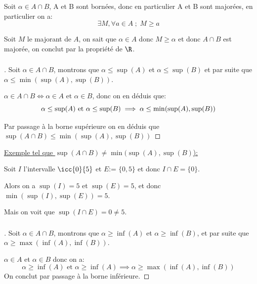 \subsubsection*{}

Soit \(\alpha \in A \cap B\), A et B sont bornées, donc en particulier A et B sont majorées, en particulier on a:
\[
   \exists M, \forall a \in A \; ; \; M \geq a
\]   

Soit \(M\) le majorant de \(A\), on sait que \(\alpha \in A\) donc \(M \geq \alpha\) et donc \(A \cap B\) est majorée, on conclut par la propriété de \(\R\).

\subsubsection*{}
\begin{proof}[\unskip\nopunct]
   Soit \(\alpha \in A \cap B\), montrons que \(\alpha \leq \sup(A)\) et \(\alpha \leq \sup(B)\) et par suite que \(\alpha \leq \min(\sup(A), \sup(B))\). \<

   \(\alpha \in A \cap B \Longleftrightarrow \alpha \in A \text{ et } \alpha \in B\), donc on en déduis que:
   \[
      \alpha \leq \sup(A) \text{ et } \alpha \leq \sup(B) \implies \alpha \leq \min(\sup(A), \sup(B))\\
   \]

   Par passage à la borne supérieure on en déduis que \(\sup(A \cap B) \leq \min(\sup(A), \sup(B))\)
\end{proof}

\underline{Exemple tel que \(\sup(A \cap B) \neq \min(\sup(A), \sup(B)\)):}\<

Soit \(I\) l'intervalle \(\icc{0}{5}\) et \(E\):= \(\bigl\{ 0, 5\bigl\}\)  et donc \(I \cap E = \bigl\{ 0 \bigl\}\).

Alors on a \(\sup(I) = 5\) et \(\sup(E) = 5\), et donc \(\min(\sup(I), \sup(E)) = 5\). 

Mais on voit que \(\sup(I \cap E) = 0 \neq 5\).

\subsubsection*{}
\begin{proof}[\unskip\nopunct]
   Soit \(\alpha \in A \cap B\), montrons que \(\alpha \geq \inf(A)\) et \(\alpha \geq \inf(B)\), et par suite que \(\alpha \geq \max(\inf(A), \inf(B))\).\<

   \(\alpha \in A\) et \(\alpha \in B\) donc on a:
   \[
      \alpha \geq \inf(A) \text{ et } \alpha \geq \inf(A) \implies \alpha \geq \max(\inf(A), \inf(B)) 
   \]
   On conclut par passage à la borne inférieure.
\end{proof} 

